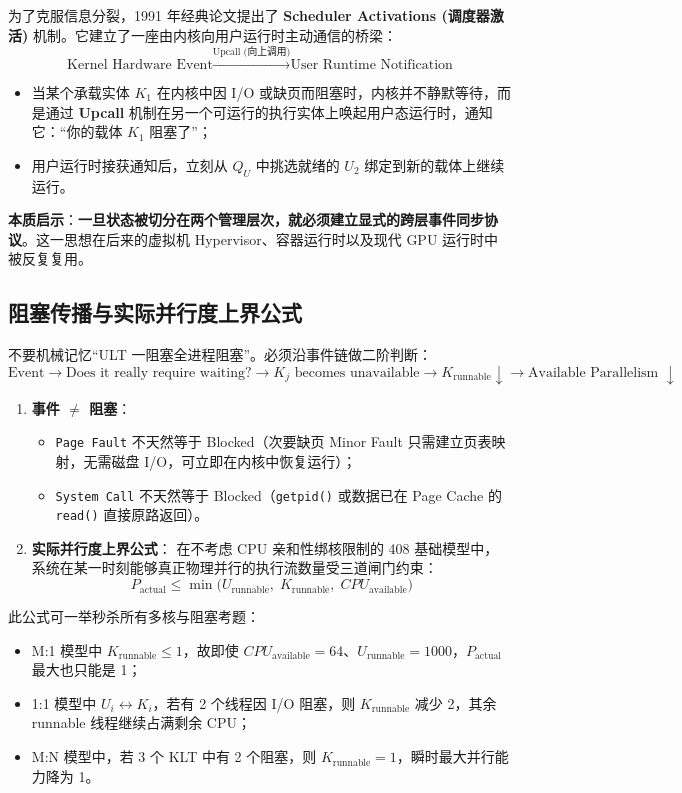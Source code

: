 \documentclass[11pt,a4paper]{ctexart}
\newcommand{\kw}[1]{\textbf{#1}}
\newcommand{\code}[1]{\texttt{#1}}
\begin{document}
为了克服信息分裂，1991 年经典论文提出了 \kw{Scheduler Activations (调度器激活)} 机制。它建立了一座由内核向用户运行时主动通信的桥梁：
\[
\boxed{\text{Kernel Hardware Event} \xrightarrow{\text{Upcall (向上调用)}} \text{User Runtime Notification}}
\]
\begin{itemize}
\item 当某个承载实体 $K_1$ 在内核中因 I/O 或缺页而阻塞时，内核并不静默等待，而是通过 \kw{Upcall} 机制在另一个可运行的执行实体上唤起用户态运行时，通知它：“你的载体 $K_1$ 阻塞了”；
\item 用户运行时接获通知后，立刻从 $Q_U$ 中挑选就绪的 $U_2$ 绑定到新的载体上继续运行。
\end{itemize}
\kw{本质启示}：\kw{一旦状态被切分在两个管理层次，就必须建立显式的跨层事件同步协议}。这一思想在后来的虚拟机 Hypervisor、容器运行时以及现代 GPU 运行时中被反复复用。

\subsection{阻塞传播与实际并行度上界公式}

不要机械记忆“ULT 一阻塞全进程阻塞”。必须沿事件链做二阶判断：
\[
\boxed{
\text{Event}
\longrightarrow
\text{Does it really require waiting?}
\longrightarrow
K_j \text{ becomes unavailable}
\longrightarrow
K_{\text{runnable}} \downarrow
\longrightarrow
\text{Available Parallelism } \downarrow
}
\]

\begin{enumerate}
\item \kw{事件 $\neq$ 阻塞}：
  \begin{itemize}
    \item \code{Page Fault} 不天然等于 Blocked（次要缺页 Minor Fault 只需建立页表映射，无需磁盘 I/O，可立即在内核中恢复运行）；
    \item \code{System Call} 不天然等于 Blocked（\code{getpid()} 或数据已在 Page Cache 的 \code{read()} 直接原路返回）。
  \end{itemize}
\item \kw{实际并行度上界公式}：
  在不考虑 CPU 亲和性绑核限制的 408 基础模型中，系统在某一时刻能够真正物理并行的执行流数量受三道闸门约束：
  \[
  \boxed{
  P_{\text{actual}} \le \min\Big( U_{\text{runnable}}, \; K_{\text{runnable}}, \; CPU_{\text{available}} \Big)
  }
  \]
\end{enumerate}

此公式可一举秒杀所有多核与阻塞考题：
\begin{itemize}
\item M:1 模型中 $K_{\text{runnable}} \le 1$，故即使 $CPU_{\text{available}} = 64$、$U_{\text{runnable}} = 1000$，$P_{\text{actual}}$ 最大也只能是 1；
\item 1:1 模型中 $U_i \leftrightarrow K_i$，若有 2 个线程因 I/O 阻塞，则 $K_{\text{runnable}}$ 减少 2，其余 runnable 线程继续占满剩余 CPU；
\item M:N 模型中，若 3 个 KLT 中有 2 个阻塞，则 $K_{\text{runnable}} = 1$，瞬时最大并行能力降为 1。
\end{itemize}
\end{document}
